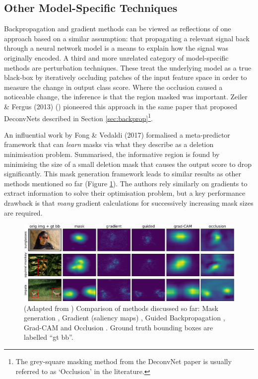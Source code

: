 \documentclass[main]{subfiles}
\begin{document}

\subsection{Other Model-Specific Techniques} \label{sec:otherms}

Backpropagation and gradient methods can be viewed as reflections of one approach based on a similar assumption: that propagating a relevant signal back through a neural network model is a means to explain how the signal was originally encoded. A third and more unrelated category of model-specific methods are perturbation techniques. These treat the underlying model as a true black-box by iteratively occluding patches of the input feature space in order to measure the change in output class score. Where the occlusion caused a noticeable change, the inference is that the region masked was important. Zeiler \& Fergus (2013) (\cite{zeilerfergus2013}) pioneered this approach in the same paper that proposed DeconvNets described in Section \ref{sec:backprop}\footnote{The grey-square masking method from the DeconvNet paper is usually referred to as `Occlusion' in the literature.}. 


An influential work by Fong \& Vedaldi (2017) \cite{perturb_fong} formalised a meta-predictor framework that can \textit{learn} masks via what they describe as a deletion minimisation problem. Summarised, the informative region is found by minimising the size of a small deletion mask that causes the output score to drop significantly. This mask generation framework leads to similar results as other methods mentioned so far (Figure \ref{comparisonimg}). The authors rely similarly on gradients to extract information to solve their optimisation problem, but a key performance drawback is that \textit{many} gradient calculations for successively increasing mask sizes are required.



\begin{figure}[h]
\centering
\includegraphics[scale=0.65]{perturb.png}
\caption{(Adapted from \cite{perturb_fong}) Comparison of methods discussed so far: Mask generation \cite{perturb_fong}, Gradient (saliency maps) \cite{saliencyII}, Guided Backpropagation \cite{springenberg}, Grad-CAM \cite{gradcam} and Occlusion \cite{zeilerfergus2013}. Ground truth bounding boxes are labelled ``gt bb''.}
\label{comparisonimg}
\end{figure}
\end{document}
